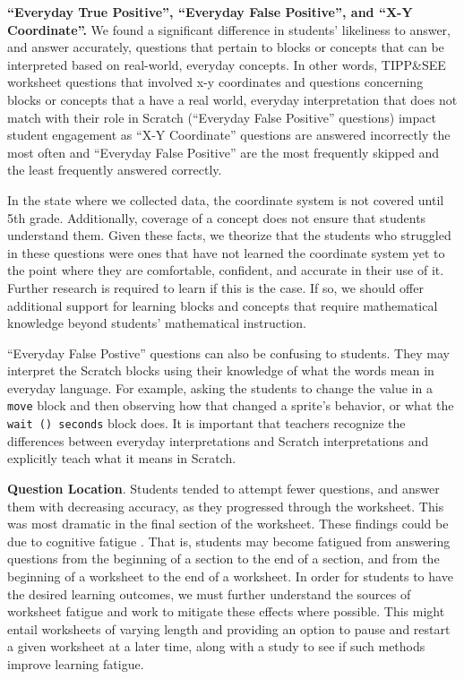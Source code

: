 \documentclass[sigconf,manuscript,review,anonymous]{acmart} %
\def\ts{TIPP\&SEE}
\begin{document}
\textbf{``Everyday True Positive'', ``Everyday False Positive'', and ``X-Y Coordinate''.} We found a significant difference in students' likeliness to answer, and answer accurately, questions that pertain to blocks or concepts that can be interpreted based on real-world, everyday concepts. In other words, \ts{} worksheet questions that involved x-y coordinates and questions concerning blocks or concepts that a have a real world, everyday interpretation that does not match with their role in Scratch (``Everyday False Positive'' questions) impact student engagement as ``X-Y Coordinate'' questions are answered incorrectly the most often and ``Everyday False Positive'' are the most frequently skipped and the least frequently answered correctly. 

In the state where we collected data, the coordinate system is not covered until 5th grade. Additionally, coverage of a concept does not ensure that students understand them. Given these facts, we theorize that the students who struggled in these questions were ones that have not learned the coordinate system yet to the point where they are comfortable, confident, and accurate in their use of it. Further research is required to learn if this is the case. If so, we should offer additional support for learning blocks and concepts that require mathematical knowledge beyond students' mathematical instruction.
 
``Everyday False Postive'' questions can also be confusing to students. They may interpret the Scratch blocks using their knowledge of what the words mean in everyday language. For example, asking the students to change the value in a \texttt{move} block and then observing how that changed a sprite's behavior, or what the \texttt{wait () seconds} block does. It is important that teachers recognize the differences between everyday interpretations and Scratch interpretations and explicitly teach what it means in Scratch.


\textbf{Question Location}. Students tended to attempt fewer questions, and answer them with decreasing accuracy, as they progressed through the worksheet. This was most dramatic in the final section of the worksheet. These findings could be due to cognitive fatigue \cite{sievertsen2016cognitive}. That is, students may become fatigued from answering questions from the beginning of a section to the end of a section, and from the beginning of a worksheet to the end of a worksheet.  In order for students to have the desired learning outcomes, we must further understand the sources of worksheet fatigue and work to mitigate these effects where possible. This might entail worksheets of varying length and providing an option to pause and restart a given worksheet at a later time, along with a study to see if such methods improve learning fatigue.
\end{document}
